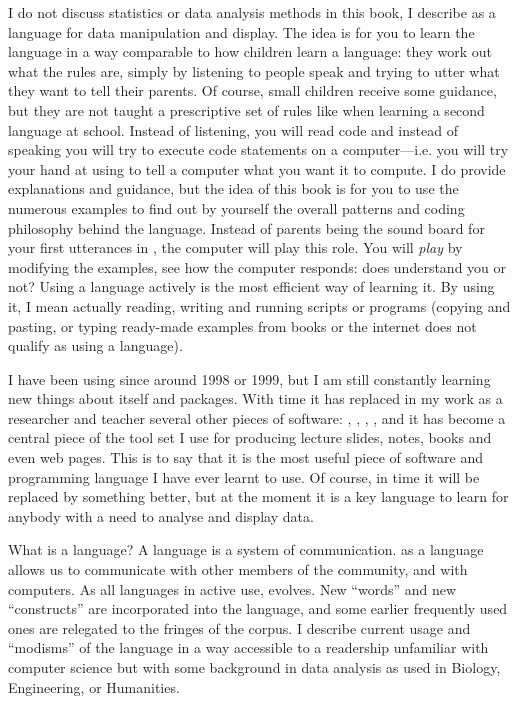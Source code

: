 I do not discuss statistics or data analysis methods in this book, I describe \Rlang as a language for data manipulation and display. The idea is for you to learn the \Rlang language in a way comparable to how children learn a language: they work out what the rules are, simply by listening to people speak and trying to utter what they want to tell their parents. Of course, small children receive some guidance, but they are not taught a prescriptive set of rules like when learning a second language at school. Instead of listening, you will read code and instead of speaking you will try to execute \Rlang  code statements on a computer---i.e. you will try your hand at using \Rlang to tell a computer what you want it to compute. I do provide explanations and guidance, but the idea of this book is for you to use the numerous examples to find out by yourself the overall patterns and coding philosophy behind the \Rlang language. Instead of parents being the sound board for your first utterances in \Rlang, the computer will play this role. You will \emph{play} by modifying the examples, see how the computer responds: does \Rlang understand you or not? Using a language actively is the most efficient way of learning it. By using it, I mean actually reading, writing and running scripts or programs (copying and pasting, or typing ready-made examples from books or the internet does not qualify as using a language).

I have been using \Rlang since around 1998 or 1999, but I am still constantly learning new things about \Rlang itself and \Rlang packages. With time it has replaced in my work as a researcher and teacher several other pieces of software: , , , , and it has become a central piece of the tool set I use for producing lecture slides, notes, books and even web pages. This is to say that it is the most useful piece of software and programming language I have ever learnt to use. Of course, in time it will be replaced by something better, but at the moment it is a key language to learn for anybody with a need to analyse and display data.

What is a language? A language is a system of communication. \Rlang as a language allows us to communicate with other members of the \Rlang community, and with computers. As all languages in active use, \Rlang evolves. New ``words'' and new ``constructs'' are incorporated into the language, and some earlier frequently used ones are relegated to the fringes of the corpus. I describe current usage and ``modisms'' of the \Rlang language in a way accessible to a readership unfamiliar with computer science but with some background in data analysis as used in Biology, Engineering, or Humanities.

